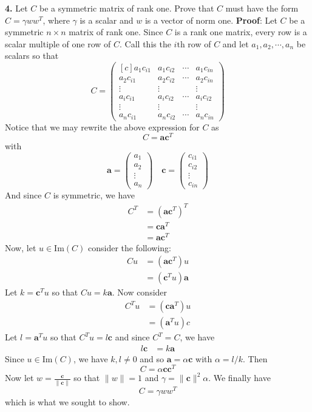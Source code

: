 \documentclass{article}
\begin{document}
\textbf{4.} Let $C$ be a symmetric matrix of rank one. Prove that $C$ must have the form $C = \gamma ww^T$, where $\gamma$ is a scalar and $w$ is a vector of norm one.
\newline\newline
\textbf{Proof}: Let $C$ be a symmetric $n \times n$ matrix of rank one. Since $C$ is a rank one matrix, every row is a scalar multiple of one row of $C$. Call this the $i\text{th}$ row of $C$ and let $a_1, a_2, \cdots, a_n$ be scalars so that
\[C = \begin{pmatrix*}[c]
    a_1c_{i1} & a_1c_{i2} & \cdots & a_1c_{in} \\
    a_2c_{i1} & a_2c_{i2} & \cdots & a_2c_{in} \\
    \vdots & \vdots & & \vdots\\
    a_ic_{i1} & a_ic_{i2} & \cdots & a_ic_{i2} \\
    \vdots & \vdots & & \vdots\\
    a_nc_{i1} & a_nc_{i2} & \cdots & a_nc_{in} 
\end{pmatrix*}\]
Notice that we may rewrite the above expression for $C$ as
\[C = \mathbf{a}\mathbf{c}^T\]
with
\[\mathbf{a} = \begin{pmatrix*}
    a_1\\
    a_2\\
    \vdots\\
    a_n
\end{pmatrix*}
\hspace{1em}
\mathbf{c} = \begin{pmatrix*}
    c_{i1}\\
    c_{i2}\\
    \vdots\\
    c_{in}
\end{pmatrix*}\]
And since $C$ is symmetric, we have
\begin{align*}
    C^T &= (\mathbf{a}\mathbf{c}^T)^T\\
    &= \mathbf{c}\mathbf{a}^T\\
    &= \mathbf{a}\mathbf{c}^T
\end{align*}
Now, let $u\in \text{Im}(C)$ consider the following:
\begin{align*}
    Cu &= (\mathbf{ac}^T)u\\
    &= (\mathbf{c}^Tu)\mathbf{a}
\end{align*}
Let $k =\mathbf{c}^Tu$ so that $Cu = k\mathbf{a}$. Now consider
\begin{align*}
    C^Tu &= (\mathbf{ca}^T)u\\
    &= (\mathbf{a}^Tu)c
\end{align*}    
Let $l = \mathbf{a}^Tu$ so that $C^Tu = l\mathbf{c}$ and since $C^T = C$, we have
\begin{align*}
l\mathbf{c} &= k\mathbf{a}
\end{align*}
Since $u \in \text{Im}(C)$, we have $k, l \neq 0$ and so $\mathbf{a} = \alpha\mathbf{c}$ with $\alpha = l/k$. Then
\[C = \alpha\mathbf{c}\mathbf{c}^T\]
Now let $w = \frac{\mathbf{c}}{\|\mathbf{c}\|}$ so that $\|w\| = 1$ and $\gamma = \|\mathbf{c}\|^2\alpha$. We finally have
\[C = \gamma ww^T\]
which is what we sought to show.
\end{document}
